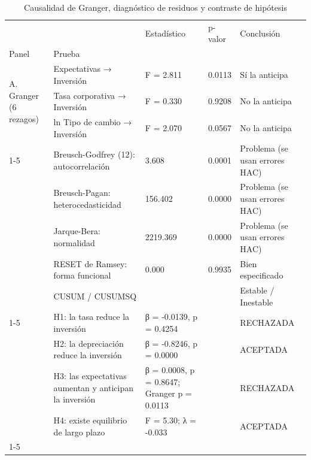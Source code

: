 \begin{table}
\caption{Causalidad de Granger, diagnóstico de residuos y contraste de hipótesis}
\label{tab:tabla6_granger_diagnostico_hipotesis}
\begin{tabular}{lllll}
\toprule
 &  & Estadístico & p-valor & Conclusión \\
Panel & Prueba &  &  &  \\
\midrule
\multirow[t]{3}{*}{A. Granger (6 rezagos)} & Expectativas → Inversión & F = 2.811 & 0.0113 & Sí la anticipa \\
 & Tasa corporativa → Inversión & F = 0.330 & 0.9208 & No la anticipa \\
 & ln Tipo de cambio → Inversión & F = 2.070 & 0.0567 & No la anticipa \\
\cline{1-5}
\multirow[t]{5}{*}{B. Diagnóstico de residuos} & Breusch-Godfrey (12): autocorrelación & 3.608 & 0.0001 & Problema (se usan errores HAC) \\
 & Breusch-Pagan: heterocedasticidad & 156.402 & 0.0000 & Problema (se usan errores HAC) \\
 & Jarque-Bera: normalidad & 2219.369 & 0.0000 & Problema (se usan errores HAC) \\
 & RESET de Ramsey: forma funcional & 0.000 & 0.9935 & Bien especificado \\
 & CUSUM / CUSUMSQ &  &  & Estable / Inestable \\
\cline{1-5}
\multirow[t]{4}{*}{C. Contraste de hipótesis} & H1: la tasa reduce la inversión & β = -0.0139, p = 0.4254 &  & RECHAZADA \\
 & H2: la depreciación reduce la inversión & β = -0.8246, p = 0.0000 &  & ACEPTADA \\
 & H3: las expectativas aumentan y anticipan la inversión & β = 0.0008, p = 0.8647; Granger p = 0.0113 &  & RECHAZADA \\
 & H4: existe equilibrio de largo plazo & F = 5.30; λ = -0.033 &  & ACEPTADA \\
\cline{1-5}
\bottomrule
\end{tabular}
\end{table}
